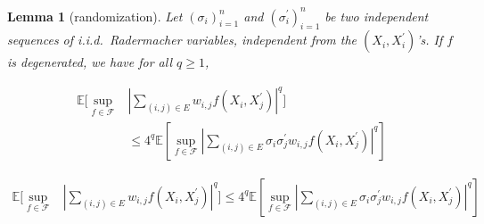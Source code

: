 \documentclass[letterpaper]{article} %
\def\DoubleColumn{}
\def\DoubleColumnEnd{}
\def\SingleColumn{}
\def\SingleColumnEnd{}
\newtheorem{lemma}{Lemma}
\newcommand{\E}{\mathbb{E}}
\newcommand{\pair}[1]{(#1)}
\begin{document}
\begin{lemma}[randomization]
    \label{le:weighted_u_statistics_randomization}
    Let $(\sigma_i)_{i=1}^n$ and $(\sigma_i^\prime)_{i=1}^n$ be two independent sequences of i.i.d.\ Radermacher variables, independent from the $(X_i,X_i^\prime)$'s. If $f$ is degenerated, we have for all $q\ge 1$,
    \DoubleColumn
    \begin{align*}
        \E[\sup_{f\in\mathcal{F}}&|\sum_{\pair{i,j}\in E} w_{i,j}f(X_i,X_j^\prime)|^q]\\
        &\le 4^q\E[\sup_{f\in\mathcal{F}}|\sum_{\pair{i,j}\in E}\sigma_i\sigma_j^\prime w_{i,j}f(X_i, X_j^\prime)|^q]
    \end{align*}
    \DoubleColumnEnd
    \SingleColumn
    \begin{align*}
        \E[\sup_{f\in\mathcal{F}}&|\sum_{\pair{i,j}\in E} w_{i,j}f(X_i,X_j^\prime)|^q]\le 4^q\E[\sup_{f\in\mathcal{F}}|\sum_{\pair{i,j}\in E}\sigma_i\sigma_j^\prime w_{i,j}f(X_i, X_j^\prime)|^q]
    \end{align*}
    \SingleColumnEnd
\end{lemma}
\end{document}
